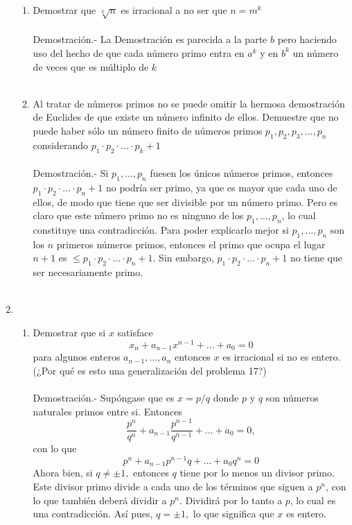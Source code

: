 \begin{enumerate}
\begin{enumerate}[\bfseries a)]
         \item Demostrar que $\sqrt[k]{n}$ es irracional a no ser que $n=m^k$\\\\
         Demostración.- \; La Demostración es parecida a la parte $b$ pero haciendo uso del hecho de que cada número primo entra en $a^k$ y en $b^k$ un número de veces que es múltiplo de $k$\\\\   

         \item Al tratar de números primos no se puede omitir la hermosa demostración de Euclides de que existe un número infinito de ellos. Demuestre que no puede haber sólo un número finito de números primos $p_1, p_2, p_3,...,p_n$ considerando $p_1\cdot p_2 \cdot ... \cdot p_k + 1$\\\\
         Demostración.- \; Si $p_1,...,p_n$ fuesen los únicos números primos, entonces $p_1 \cdot p_2 \cdot ... \cdot p_n + 1$ no podría ser primo, ya que es mayor que cada uno de ellos, de modo que tiene que ser divisible por un número primo. Pero es claro que este número primo no es ninguno de los $p_1,...,p_n$, lo cual constituye una contradicción. Para poder explicarlo mejor si $p_1,...,p_n$ son los $n$ primeros números primos, entonces el primo que ocupa el lugar $n+1$ es $\leq p_1 \cdot p_2 \cdot ... \cdot p_n+1$. Sin embargo, $p_1\cdot p_2 \cdot ...\cdot p_n + 1$ no tiene que ser necesariamente primo.\\\\       
         \end{enumerate} 

      \item
	 \begin{enumerate}[\bfseries (a)]
	    \item Demostrar que si $x$ satisface
	       $$x_n + a_{n-1}x^{n-1} + ... + a_0 = 0$$
	       para algunos enteros $a_{n-1},...,a_n$ entonces $x$ es irracional si no es entero. (¿Por qué es esto una generalización del problema 17?)\\\\
	       Demostración.- \; Supóngase que es $x=p/q$ donde $p$ y $q$ son números naturales primos entre si. Entonces $$\dfrac{p^n}{q^n} + a_{n-1} \dfrac{p^{n-1}}{q^{n-1}} + ... + a_0 = 0,$$
	       con lo que 
	       $$p^n + a_{n-1} p ^{n-1}q + ... + a_0 q^n = 0$$
	       Ahora bien, si $q \neq \pm 1,$ entonces $q$ tiene por lo menos un divisor primo. Este divisor primo divide a cada uno de los términos que siguen a $p^n$, con lo que también deberá dividir a $p^n$. Dividirá por lo tanto a $p$, lo cual es una contradicción. Así pues, $q= \pm 1,$ lo que significa que $x$ es entero.\\\\


\end{enumerate}
\end{enumerate}
